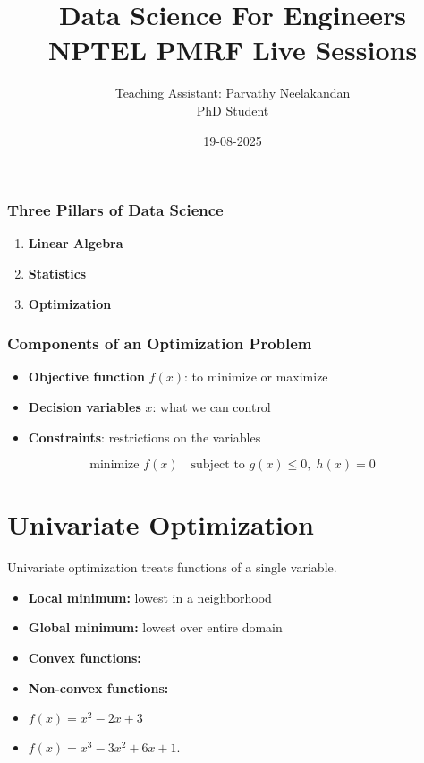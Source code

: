 \documentclass[11pt,a4paper]{article}
\title{\color{blue}Data Science For Engineers\\NPTEL PMRF Live Sessions\\}
\author{Teaching Assistant: Parvathy Neelakandan\\PhD Student}
\date{19-08-2025}
\theoremstyle{definition}
\begin{document}
\maketitle

\subsubsection*{Three Pillars of Data Science}
\begin{enumerate}
  \item \textbf{Linear Algebra} 
  \item \textbf{Statistics} 
  \item \textbf{Optimization} 
\end{enumerate}

\subsubsection*{Components of an Optimization Problem}
\begin{itemize}
  \item \textbf{Objective function} $f(x)$: to minimize or maximize
  \item \textbf{Decision variables} $x$: what we can control
  \item \textbf{Constraints}: restrictions on the variables
\end{itemize}
\[
\text{minimize } f(x) \quad \text{subject to } g(x)\le 0,\; h(x)=0
\]


\section*{Univariate Optimization}

Univariate optimization treats functions of a single variable.

\begin{itemize}
  \item \textbf{Local minimum:} lowest in a neighborhood
  \item \textbf{Global minimum:} lowest over entire domain
  \item \textbf{Convex functions:} 
  \item \textbf{Non-convex functions:}
\end{itemize}

\begin{quesbox}
  \begin{itemize}
  \item \(f(x)=x^2-2x+3\)
  \item \(f(x)=x^3-3x^2+6x+1\).
  \end{itemize}
\end{quesbox}
\end{document}
